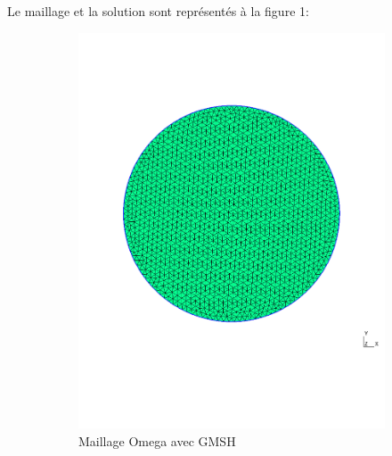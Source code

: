 \documentclass{article}
\begin{document}
Le maillage et la solution sont représentés à la figure 1:
\begin{figure}[H]
    \centering
    \begin{subfigure}[b]{0.52\linewidth}        %
        \centering
        \includegraphics[width=\linewidth]{data/maillage_gmsh.png}
        \caption{Maillage Omega avec GMSH}
        \label{fig:A}
    \end{subfigure}
    \begin{subfigure}[b]{0.46\linewidth}        %
        \centering

\end{subfigure}
\end{figure}
\end{document}
